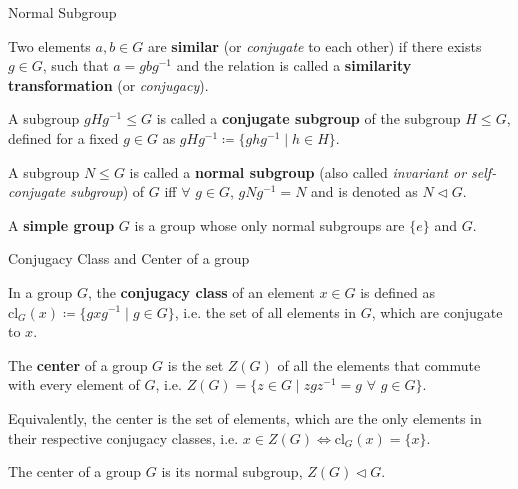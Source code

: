 \documentclass{beamer}
\newcommand\boldtext[1]{\textcolor{bolds}{\textbf{#1}}}
\newcommand\italictext[1]{\textcolor{italics}{\textit{#1}}}
\begin{document}
\begin{frame}{Normal Subgroup}
    \begin{definition}
        Two elements $a,b\in G$ are \boldtext{similar} (or \italictext{conjugate} to each other) if there exists $g\in G$, such that $a=gbg^{-1}$ and the relation is called a \boldtext{similarity transformation} (or \italictext{conjugacy}).
    \end{definition}
    \begin{definition}
        A subgroup $gHg^{-1}\leq G$ is called a \boldtext{conjugate subgroup} of the subgroup $H\leq G$, defined for a fixed $g\in G$ as $gHg^{-1}\coloneqq\{ghg^{-1} \mid h \in H\}$.
    \end{definition}
    \begin{definition}
        A subgroup $N\leq G$ is called a \boldtext{normal subgroup} (also called \italictext{invariant or self-conjugate subgroup}) of $G$ iff   $\forall$ $g\in G$, $gNg^{-1}=N$ and is denoted as $N\vartriangleleft G$.
    \end{definition}
    \begin{definition}
        A \boldtext{simple group} $G$ is a group whose only normal subgroups are $\{e\}$ and $G$.  
    \end{definition}
\end{frame}

\begin{frame}{Conjugacy Class and Center of a group}
    \begin{definition}
        In a group $G$, the \boldtext{conjugacy class} of an element $x\in G$ is defined as $\text{cl}_G(x)\coloneqq\{gxg^{-1} \mid g \in G\}$, i.e. the set of all elements in $G$, which are conjugate to $x$. 
    \end{definition}
    \begin{definition}
        The \boldtext{center} of a group $G$ is the set $Z(G)$ of all the elements that commute with every element of $G$, i.e. $Z(G)=\{z\in G \mid zgz^{-1}=g$  $\forall$ $g\in G\}$.
    \end{definition}
    Equivalently, the center is the set of elements, which are the only elements in their respective conjugacy classes, i.e. $x\in Z(G)\iff\text{cl}_G(x)=\{x\}$.
    \begin{theorem}
        The center of a group $G$ is its normal subgroup, $Z(G)\vartriangleleft G$.
    \end{theorem}
\end{frame}
\end{document}
